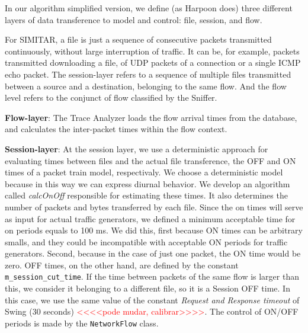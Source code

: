 In our algorithm simplified version, we define (as Harpoon does) three different layers of data transference to model and control: file, session, and flow. 


For SIMITAR, a file is just a sequence of consecutive packets transmitted continuously, without large interruption of traffic. It can be, for example, packets transmitted downloading a file, of UDP packets of a connection or a single ICMP echo packet. The session-layer refers to a sequence of multiple files transmitted between a source and a destination, belonging to the same flow.  And the flow level refers to the conjunct of flow classified by the Sniffer.  


\textbf{Flow-layer}: The Trace Analyzer loads the flow arrival times from the database, and calculates the inter-packet times within the flow context. 


\textbf{Session-layer}: At the session layer, we use a deterministic approach for evaluating times between files and the actual file transference, the OFF and ON times of a packet train model, respectivaly. We choose a deterministic model because in this way we can express diurnal behavior\cite{harpoon-paper}.  We develop an algorithm called \textit{calcOnOff} responsible for estimating these times. It also determines the number of packets and bytes transferred by each file. Since the on times will serve as input for actual traffic generators, we defined a minimum acceptable time for on periods equals to 100 ms. We did this, first because ON times can be arbitrary smalls, and they could be incompatible with acceptable ON periods for traffic generators. Second, because in the case of just one packet, the ON time would be zero. OFF times, on the other hand, are defined by the constant \texttt{m\_session\_cut\_time}. If the time between packets of the same flow is larger than this, we consider it belonging to a different file, so it is a Session OFF time. In this case, we use the same value of the constant \textit{Request and Response timeout} of Swing\cite{swing-paper} (30 seconds) \textcolor{red}{<<<<pode mudar, calibrar>>>>}.
The control of ON/OFF periods is made by the \texttt{NetworkFlow} class.

